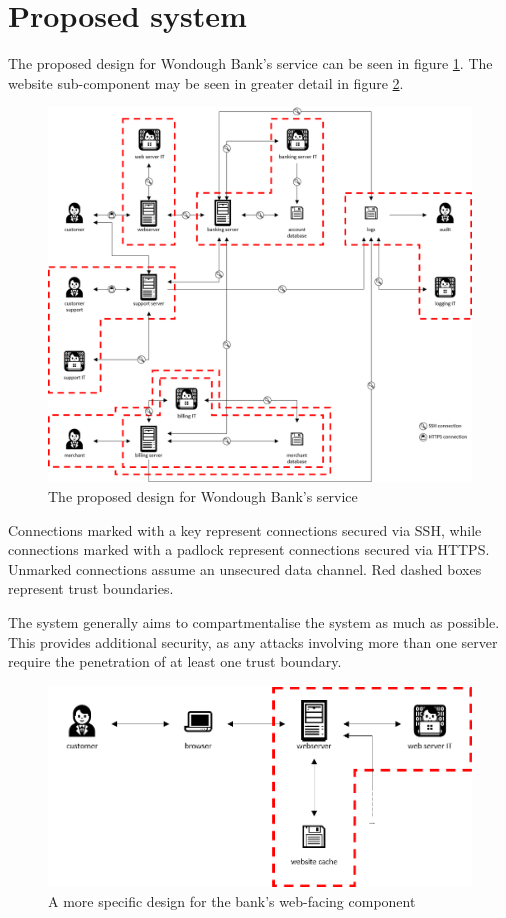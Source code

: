 \section{Proposed system}

The proposed design for Wondough Bank's service can be seen in figure \ref{fullDesign}. The website sub-component may be seen in greater detail in figure \ref{website}. 

\begin{figure}
    \includegraphics[width=\columnwidth]{images/bank-design}
    \caption{The proposed design for Wondough Bank's service}
    \centering
    \label{fullDesign}
\end{figure}

Connections marked with a key represent connections secured via SSH, while connections marked with a padlock represent connections secured via HTTPS. Unmarked connections assume an unsecured data channel. Red dashed boxes represent trust boundaries. 

The system generally aims to compartmentalise the system as much as possible. This provides additional security, as any attacks involving more than one server require the penetration of at least one trust boundary. 

\begin{figure}
    \includegraphics[width=\columnwidth]{images/web-design}
    \caption{A more specific design for the bank's web-facing component}
    \centering
    \label{website}
\end{figure}


